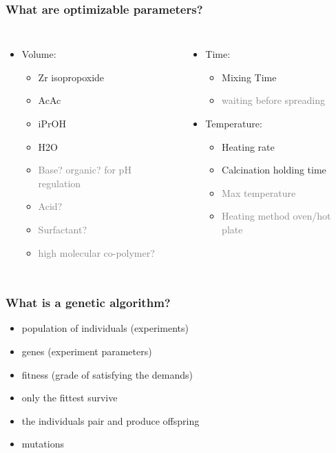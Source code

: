 \documentclass{beamer}
\newcommand{\me}[1]{\textcolor{gray}{#1}}
\begin{document}
\begin{frame}
	\frametitle{What are optimizable parameters?}
	\begin{columns}[t]
			\begin{itemize}
				\item Volume:
				\begin{itemize}
					\item Zr isopropoxide 
					\item AcAc
					\item iPrOH
					\item H2O
					\item \me{Base? organic? for pH regulation}
					\item \me{Acid?}
					\item \me{Surfactant?}
					\item \me{high molecular co-polymer?}
				\end{itemize}
			\end{itemize}
			\pause
			\begin{itemize}
				\item Time:
				\begin{itemize}
					\item Mixing Time
					\item \me{waiting before spreading}
				\end{itemize}
				\item Temperature:
				\begin{itemize}
					\item Heating rate
					\item Calcination holding time
					\item \me{Max temperature}
					\item \me{Heating method oven/hot plate}
				\end{itemize}
			\end{itemize}
	\end{columns}
\end{frame}

\begin{frame}
	\frametitle{What is a genetic algorithm?}
	\begin{itemize}
		\item population of individuals (experiments)
		\item genes (experiment parameters)
		\item fitness (grade of satisfying the demands)
		\item only the fittest survive
		\item the individuals pair and produce offspring
		\item mutations
	\end{itemize}
\end{frame}
\end{document}
